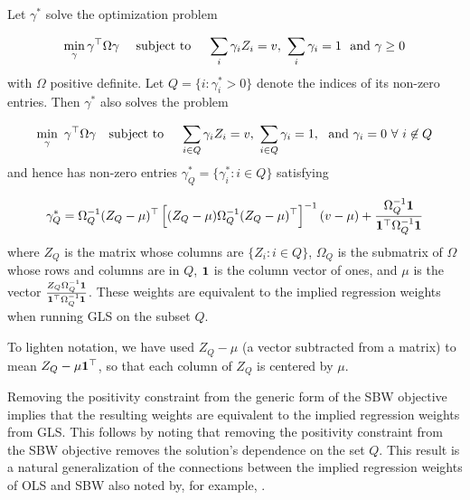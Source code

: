 \begin{proposition}\label{cl56}
Let $\gamma^*$ solve the optimization problem

\begin{equation}\label{eqn:a1.1}
 \min_\gamma \gamma^\top \Omega \gamma \quad \text{ subject to } \quad  \sum_i \gamma_i Z_i = v,\ \sum_i \gamma_i = 1 \ \textup{ and } \gamma \geq 0%
\end{equation}
with $\Omega$ positive definite. Let $Q = \{i: \gamma^*_i > 0\}$ denote the indices of its non-zero entries. Then $\gamma^*$ also solves the problem
  
  \begin{equation}\label{eqn:a1.2}
   \min_{\gamma}  \ \gamma^\top \Omega \gamma  \quad \textup{subject to }\quad \sum_{i \in Q} \gamma_i Z_i = v,\ \sum_{i \in Q} \gamma_i = 1,\ \textup{ and }   \gamma_i = 0\  \forall\ i \not\in Q
  \end{equation}
and hence has non-zero entries $\gamma^*_Q = \{\gamma_i^*: i \in Q\}$ satisfying
 
 \begin{equation}\label{eqn:a1.3}
 \gamma^*_{Q} = \Omega_{Q}^{-1} (Z_{Q} - \mu)^\top\left[ (Z_Q - \mu) \Omega_{Q}^{-1} (Z_Q - \mu)^\top\right]^{-1} (v - \mu) + \frac{\Omega^{-1}_Q {\bf 1} }{{\bf 1}^\top \Omega^{-1}_Q {\bf 1}}
 \end{equation}
where $Z_{Q}$ is the matrix whose columns are $\{Z_i: i \in Q\}$, $\Omega_Q$ is the submatrix of $\Omega$ whose rows and columns are in $Q$, ${\bf 1}$ is the column vector of ones, and $\mu$ is the vector $\frac{Z_{Q}\Omega_{Q}^{-1} {\bf 1}}{ {\bf 1}^\top \Omega^{-1}_Q {\bf 1}}$. These weights are equivalent to the implied regression weights when running GLS on the subset $Q$.
\end{proposition}

\begin{remark}
To lighten notation, we have used $Z_Q - \mu$ (a vector subtracted from a matrix) to mean $Z_Q - \mu{\bf 1}^\top$, so that each column of $Z_{Q}$ is centered by $\mu$. 
\end{remark}

\begin{remark}
Removing the positivity constraint from the generic form of the SBW objective implies that the resulting weights are equivalent to the implied regression weights from GLS. This follows by noting that removing the positivity constraint from the SBW objective removes the solution's dependence on the set $Q$. This result is a natural generalization of the connections between the implied regression weights of OLS and SBW also noted by, for example, \citet{chattopadhyay2021implied}.
\end{remark}

